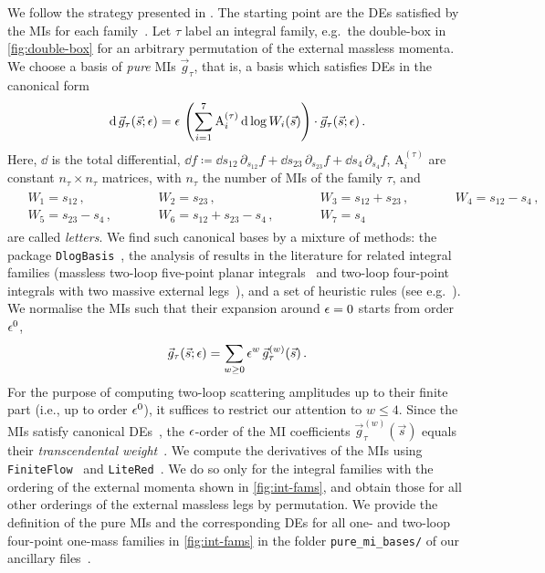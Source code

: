 \documentclass[main.tex]{subfiles}
\begin{document}
We follow the strategy presented in . The starting point are the DEs satisfied by the MIs for each family~\cite{Barucchi:1973zm,KOTIKOV1991158,KOTIKOV1991123,Gehrmann:1999as,Bern:1993kr}. Let $\tau$ label an integral family, e.g.\ the double-box in \cref{fig:double-box} for an arbitrary permutation of the external massless momenta. We choose a basis of \emph{pure} MIs $\vec{g}_{\tau}$, that is, a basis which satisfies DEs in the canonical form~\cite{Henn:2013pwa}
\begin{align}
\label{eqQED:canonicalDEs}
\mathrm{d} \, \vec{g}_{\tau}(\vec{s}; \epsilon) = \epsilon \, \left( \sum_{i=1}^{7} \mathrm{A}^{(\tau)}_i \, \mathrm{d} \log W_i(\vec{s}) \right) \cdot \vec{g}_{\tau}(\vec{s}; \epsilon) \,.
\end{align}
Here, $\dd$ is the total differential, $\dd f \coloneqq \dd s_{12} \, \partial_{s_{12}} f + \dd s_{23} \, \partial_{s_{23}} f +  \dd s_{4} \, \partial_{s_{4}} f $, $\mathrm{A}^{(\tau)}_i$ are constant $n_{\tau} \times n_{\tau}$ matrices, with $n_{\tau}$ the number of MIs of the family $\tau$, and 
\begin{align}
\label{eqQED:alphabet}
\begin{alignedat}{4}
& W_1 = s_{12} \,, 
&& W_2 = s_{23} \,, 
&& W_3 = s_{12} + s_{23} \,, \qquad
&& W_4 = s_{12} - s_4 \,,  \\
& W_5 = s_{23} - s_4 \,, \qquad
&& W_6 = s_{12} + s_{23} - s_4 \,, \qquad
&& W_7 = s_4 \, &&
\end{alignedat}
\end{align}
are called \emph{letters}. We find such canonical bases by a mixture of methods: the package \texttt{DlogBasis}~\cite{Henn:2020lye}, the analysis of results in the literature for related integral families (massless two-loop five-point planar integrals~\cite{Gehrmann:2015bfy} and two-loop four-point integrals with two massive external legs~\cite{Henn:2014lfa,Caola:2014lpa}), and a set of heuristic rules (see e.g.\ ).
We normalise the MIs such that their expansion around $\epsilon=0$ starts from order $\epsilon^0$,
\begin{align}
\vec{g}_{\tau}(\vec{s} ; \epsilon) = \sum_{w \ge 0} \epsilon^w \, \vec{g}^{(w)}_{\tau}(\vec{s}) \,.
\end{align}
For the purpose of computing two-loop scattering amplitudes up to their finite part (i.e., up to order $\epsilon^0$), it suffices to restrict our attention to $w \le 4$.
Since the MIs satisfy canonical DEs~, the $\epsilon$-order of the \ac{MI} coefficients $\vec{g}^{(w)}_{\tau}(\vec{s})$ equals their \emph{transcendental weight}~\cite{Henn:2013pwa}.
We compute the derivatives of the MIs using \texttt{FiniteFlow}~\cite{Peraro:2019svx} and \texttt{LiteRed}~\cite{Lee:2012cn}.
We do so only for the integral families with the ordering of the external momenta shown in \cref{fig:int-fams}, and obtain those for all other orderings of the external massless legs by permutation. 
We provide the definition of the pure MIs and the corresponding DEs for all one- and two-loop four-point one-mass families in \cref{fig:int-fams} in the folder \texttt{pure\_mi\_bases/} of our ancillary files~\cite{zenodo}. 
\end{document}
